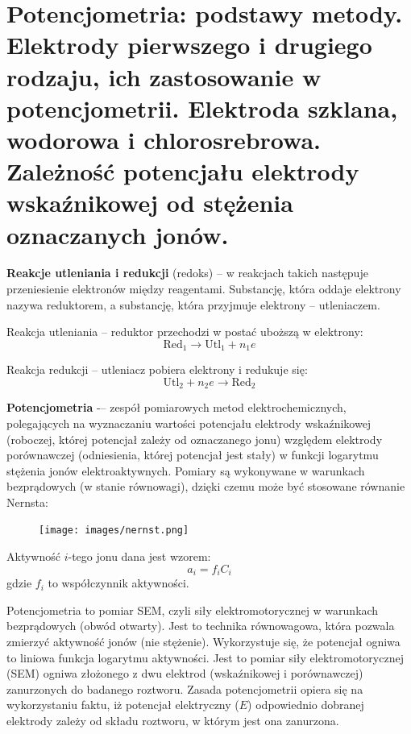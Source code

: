 \documentclass{article}
\begin{document}
\section{Potencjometria: podstawy metody. Elektrody pierwszego i drugiego rodzaju, ich zastosowanie w potencjometrii. Elektroda szklana, wodorowa i chlorosrebrowa. Zależność potencjału elektrody wskaźnikowej od stężenia oznaczanych jonów.}

\textbf{Reakcje utleniania i redukcji} (redoks) -- w reakcjach takich następuje przeniesienie elektronów między reagentami. Substancję, która oddaje elektrony nazywa reduktorem, a substancję, która przyjmuje elektrony -- utleniaczem.

Reakcja utleniania -- reduktor przechodzi w postać uboższą w elektrony:
\begin{equation*}
    \text{Red}_1 \rightarrow \text{Utl}_1+n_1e
\end{equation*}

Reakcja redukcji -- utleniacz pobiera elektrony i redukuje się:
\begin{equation*}
    \text{Utl}_2 +n_2e \rightarrow \text{Red}_2
\end{equation*}

\textbf{Potencjometria} -– zespół pomiarowych metod elektrochemicznych, polegających na wyznaczaniu wartości potencjału elektrody wskaźnikowej (roboczej, której potencjał zależy od oznaczanego jonu) względem elektrody porównawczej (odniesienia, której potencjał jest stały) w funkcji logarytmu stężenia jonów elektroaktywnych. Pomiary są wykonywane w warunkach bezprądowych (w stanie równowagi), dzięki czemu może być stosowane równanie Nernsta:
\begin{figure}[H]
    \centering
    \texttt{[image: images/nernst.png]}
\end{figure}

Aktywność $i$-tego jonu dana jest wzorem:
\begin{equation*}
    a_i=f_iC_i
\end{equation*}
gdzie $f_i$ to współczynnik aktywności.

Potencjometria to pomiar SEM, czyli siły elektromotorycznej w warunkach bezprądowych (obwód otwarty). Jest to technika równowagowa, która pozwala zmierzyć aktywność jonów (nie stężenie). Wykorzystuje się, że potencjał ogniwa to liniowa funkcja logarytmu aktywności. Jest to pomiar siły elektromotorycznej (SEM) ogniwa złożonego z dwu elektrod (wskaźnikowej i porównawczej) zanurzonych do badanego roztworu. Zasada potencjometrii opiera się na wykorzystaniu faktu, iż potencjał elektryczny ($E$) odpowiednio dobranej elektrody zależy od składu roztworu, w którym jest ona zanurzona.
\end{document}
